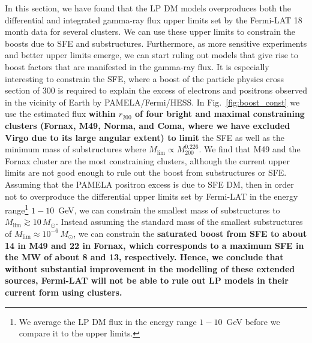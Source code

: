 \documentclass[10pt,aps,pra,reprint,amsmath,amsfonts,amssymb,showpacs,nofootinbib,floatfix]{revtex4-1}
\def\del#1{{}}
\def\C#1{{\bf #1}}
\newcommand{\rmn}{\mathrm}
\newcommand{\msun}{M_\odot}
\newcommand{\rvir}{r_{200}}
\newcommand{\mvir}{M_{200}}
\begin{document}
In this section, we have found that the LP DM models overproduces both
the differential and integrated gamma-ray flux upper limits set by the
Fermi-LAT 18 month data for several clusters. We can use these upper
limits to constrain the boosts due to SFE and
substructures. Furthermore, as more sensitive experiments and better
upper limits emerge, we can start ruling out models that give rise to
boost factors that are manifested in the gamma-ray flux. It is
especially interesting to constrain the SFE, where a boost of the
particle physics cross section of 300 is required to explain the
excess of electrons and positrons observed in the vicinity of Earth by
PAMELA/Fermi/HESS. In Fig.~\ref{fig:boost_const} we use the estimated
flux \C{within $\rvir$ of four bright and maximal constraining
  clusters (Fornax, M49, Norma, and Coma, where we have excluded Virgo
  due to its large angular extent) to limit} the SFE as well as the
minimum mass of substructures where
$M_\rmn{lim}\propto\mvir^{0.226}$. We find that M49 and the Fornax
cluster are the most constraining clusters, although the current upper
limits are not good enough to rule out the boost from substructures or
SFE. Assuming that the PAMELA positron excess is due to SFE DM, then
in order not to overproduce the differential upper limits set by
Fermi-LAT in the energy range\footnote{We average the LP DM flux in
  the energy range $1-10$~GeV before we compare it to the upper
  limits.}  $1-10$~GeV, we can constrain the smallest mass of
substructures to $M_\rmn{lim}\gtrsim 10\,\msun$. Instead assuming the
standard mass of the smallest substructures of $M_\rmn{lim}\approx
10^{-6}\,\msun$, we can constrain the \C{saturated boost from SFE to
  about 14 in M49 and 22 in Fornax, which corresponds to a maximum SFE
  in the MW of about 8 and 13, respectively. Hence, we conclude that
  without substantial improvement in the modelling of these extended
  sources, Fermi-LAT will not be able to rule out LP models in their
  current form using clusters.} \del{Note that after about six years
  of observations with Fermi-LAT, we will be able to rule out the LP
  model assuming a substructure boost with a smallest mass of
  $M_\rmn{lim} \approx 10^{-6}\,\msun$.}
\end{document}
